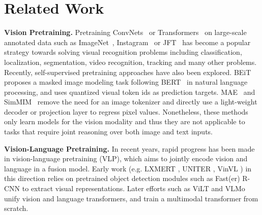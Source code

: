 \section{Related Work}
\textbf{Vision Pretraining.}
Pretraining ConvNets~\cite{krizhevsky2012imagenet} or Transformers~\cite{vaswani2017attention} on large-scale annotated data such as ImageNet~\cite{girshick2014rich, long2015fully, simonyan2014two}, Instagram~\cite{mahajan2018exploring} or JFT~\cite{zhai2021scaling} has become a popular strategy towards solving visual recognition problems including classification, localization, segmentation, video recognition, tracking and many other problems. Recently, self-supervised pretraining approaches have also been explored. BEiT~\cite{bao2021beit} proposes a masked image modeling task following BERT~\cite{devlin2018bert} in natural language processing, and uses quantized visual token ids as prediction targets. MAE~\cite{he2021masked} and SimMIM~\cite{xie2021simmim} remove the need for an image tokenizer and directly use a light-weight decoder or projection layer to regress pixel values.
Nonetheless,
these methods only learn models for the vision modality and thus they are not applicable to tasks that require joint reasoning over both image and text inputs.

\textbf{Vision-Language Pretraining.}
In recent years, rapid progress has been made in vision-language pretraining (VLP),
which aims to jointly encode vision and language in a fusion model.
Early work (e.g. LXMERT \cite{tan2019lxmert},
UNITER \cite{chen2020uniter}, VinVL \cite{Zhang_2021_CVPR}) in this direction relies on pretrained object detection modules such as Fast(er) R-CNN \citep{NIPS2015_14bfa6bb} to extract visual representations.
Later efforts such as ViLT \cite{kim2021vilt} and VLMo \cite{wang2021vlmo} unify vision and language transformers,
and train a multimodal transformer from scratch.

